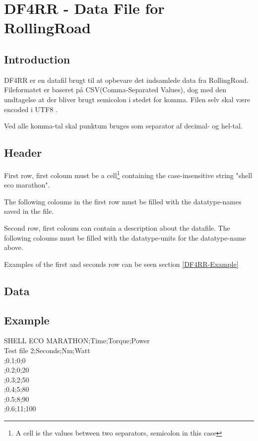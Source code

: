 \section{DF4RR - Data File for RollingRoad}

\subsection{Introduction}

 

DF4RR er en datafil brugt til at opbevare det indsamlede data fra RollingRoad. Fileformatet er baseret på CSV(Comma-Separated Values), dog med den undtagelse at der bliver brugt semicolon i stedet for komma.  Filen selv skal være encoded i UTF8 .

Ved alle komma-tal skal punktum bruges som separator af decimal- og hel-tal.

\subsection{Header}

First row, first coloum must be a cell\footnote{A cell is the values between two separators, semicolon in this case} containing the case-insensitive string "shell eco marathon".

The following coloums in the first row must be filled with the datatype-names saved in the file.

Second row, first coloum can contain a description about the datafile. The following coloums must be filled with the datatype-units for the datatype-name above. 

Examples of the first and seconds row can be seen section \vref{DF4RR-Example}

\subsection{Data}

\subsection{Example}
\label{DF4RR-Example}

SHELL ECO MARATHON;Time;Torque;Power\\
Test file 2;Seconds;Nm;Watt\\
;0.1;0;0\\
;0.2;0;20\\
;0.3;2;50\\
;0.4;5;80\\
;0.5;8;90\\
;0.6;11;100\\
